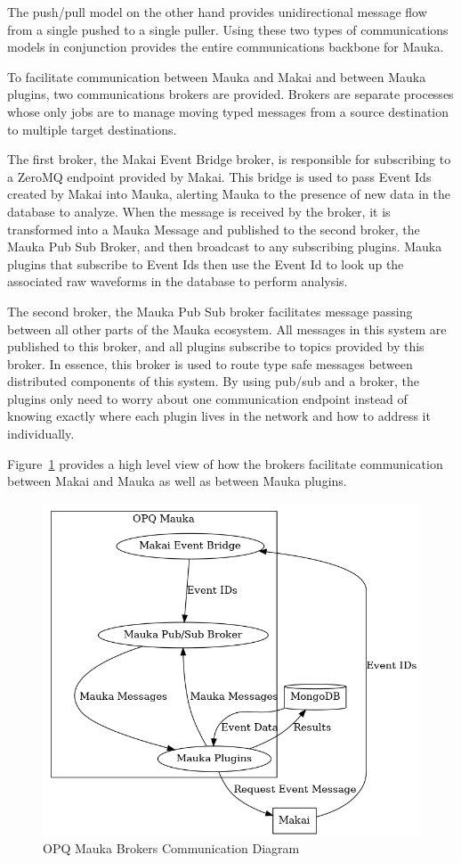 The push/pull model on the other hand provides unidirectional message flow from a single pushed to a single puller. Using these two types of communications models in conjunction provides the entire communications backbone for Mauka.

To facilitate communication between Mauka and Makai and between Mauka plugins, two communications brokers are provided. Brokers are separate processes whose only jobs are to manage moving typed messages from a source destination to multiple target destinations.

The first broker, the Makai Event Bridge broker, is responsible for subscribing to a ZeroMQ endpoint provided by Makai. This bridge is used to pass Event Ids created by Makai into Mauka, alerting Mauka to the presence of new data in the database to analyze. When the message is received by the broker, it is transformed into a Mauka Message and published to the second broker, the Mauka Pub Sub Broker, and then broadcast to any subscribing plugins. Mauka plugins that subscribe to Event Ids then use the Event Id to look up the associated raw waveforms in the database to perform analysis.

The second broker, the Mauka Pub Sub broker facilitates message passing between all other parts of the Mauka ecosystem. All messages in this system are published to this broker, and all plugins subscribe to topics provided by this broker. In essence, this broker is used to route type safe messages between distributed components of this system. By using pub/sub and a broker, the plugins only need to worry about one communication endpoint instead of knowing exactly where each plugin lives in the network and how to address it individually.

Figure~\ref{fig:mauka_brokers} provides a high level view of how the brokers facilitate communication between Makai and Mauka as well as between Mauka plugins.

\begin{figure}
	\centering
	\includegraphics[width=\linewidth]{figures/mauka_brokers_communication.png}
	\caption{OPQ Mauka Brokers Communication Diagram}
	\label{fig:mauka_brokers}
\end{figure}

